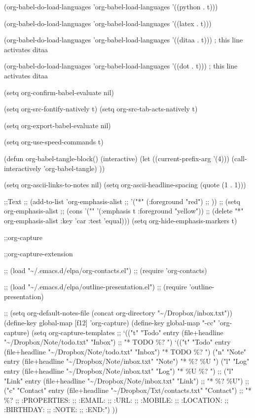 \documentclass[presentation]{beamer}
\begin{document}
(org-babel-do-load-languages
 'org-babel-load-languages
 '((python . t)))

(org-babel-do-load-languages
 'org-babel-load-languages
 '((latex . t)))

(org-babel-do-load-languages
 'org-babel-load-languages
 '((ditaa . t))) ; this line activates ditaa

(org-babel-do-load-languages
 'org-babel-load-languages
 '((dot . t))) ; this line activates ditaa

(setq org-confirm-babel-evaluate nil)


(setq org-src-fontify-natively t)
(setq org-src-tab-acts-natively t)

(setq org-export-babel-evaluate nil)

(setq org-use-speed-commands t)

(defun org-babel-tangle-block()
  (interactive)
  (let ((current-prefix-arg '(4)))
    (call-interactively 'org-babel-tangle)
    ))

(setq org-ascii-links-to-notes nil)
(setq org-ascii-headline-spacing (quote (1 . 1)))

;;Text
;; (add-to-list 'org-emphasis-alist
;;              '("*" (:foreground "red")
;;                ))
;; (setq org-emphasis-alist
;;       (cons '("\alert{" '(:emphasis t :foreground "yellow"))
;;             (delete} "*" org-emphasis-alist :key 'car :test 'equal)))
(setq org-hide-emphasis-markers t)

;;org-capture

;;org-capture-extension

;; (load "\textasciitilde{}/.emacs.d/elpa/org-contacts.el")
;; (require 'org-contacts)

;; (load "\textasciitilde{}/.emacs.d/elpa/outline-presentation.el")
;; (require 'outline-presentation)


;; (setq org-default-notes-file (concat org-directory "\textasciitilde{}/Dropbox/inbox.txt"))
(define-key global-map [f12] 'org-capture)
(define-key global-map "\C-cc" 'org-capture)
(setq org-capture-templates
      ;; `(("t" "Todo" entry (file+headline "\textasciitilde{}/Dropbox/Note/todo.txt" "Inbox")
      ;;    "* TODO \%? ")
      `(("t" "Todo" entry (file+headline "\textasciitilde{}/Dropbox/Note/todo.txt" "Inbox")
         "* TODO \%? ")
        ("n" "Note" entry (file+headline "\textasciitilde{}/Dropbox/Note/inbox.txt" "Note")
         "* \%? \n \n \%U \n  ")
        ("l" "Log" entry (file+headline "\textasciitilde{}/Dropbox/Note/inbox.txt" "Log")
         "*  \%U \n \n \%? ")
        ;; ("l" "Link" entry (file+headline "\textasciitilde{}/Dropbox/Note/inbox.txt" "Link")
        ;;  "* \%? \n\%U\n")
        ;; ("c" "Contact" entry (file+headline "\textasciitilde{}/Dropbox/Txt/contacts.txt" "Contact")
        ;;          "* \%?
        ;; :PROPERTIES:
        ;; :EMAIL:
        ;; :URL:
        ;; :MOBILE:
        ;; :LOCATION:
        ;; :BIRTHDAY:
        ;; :NOTE:
        ;; :END:")
        ))
\end{document}
